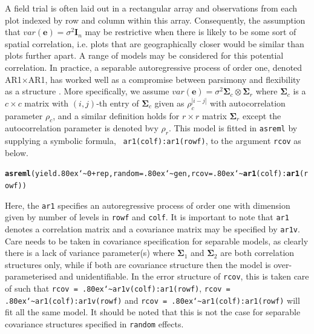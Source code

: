\documentclass[runningheads]{llncs}\usepackage[]{graphicx}\usepackage[]{color}
\makeatletter
\newcommand{\hlnum}[1]{\textcolor[rgb]{0.686,0.059,0.569}{#1}}%
\newcommand{\hlopt}[1]{\textcolor[rgb]{0,0,0}{#1}}%
\newcommand{\hlstd}[1]{\textcolor[rgb]{0.345,0.345,0.345}{#1}}%
\newcommand{\hlkwc}[1]{\textcolor[rgb]{0.333,0.667,0.333}{#1}}%
\newcommand{\hlkwd}[1]{\textcolor[rgb]{0.737,0.353,0.396}{\textbf{#1}}}%
\newenvironment{kframe}{%
 \def\at@end@of@kframe{}%
 \ifinner\ifhmode%
  \def\at@end@of@kframe{\end{minipage}}%
  \begin{minipage}{\columnwidth}%
 \fi\fi%
 \def\FrameCommand##1{\hskip\@totalleftmargin \hskip-\fboxsep
 \colorbox{shadecolor}{##1}\hskip-\fboxsep
     \hskip-\linewidth \hskip-\@totalleftmargin \hskip\columnwidth}%
 \MakeFramed {\advance\hsize-\width
   \@totalleftmargin\z@ \linewidth\hsize
   \@setminipage}}%
 {\par\unskip\endMakeFramed%
 \at@end@of@kframe}
\newenvironment{knitrout}{}{} %
\newcommand{\mytilde}{\lower.80ex\hbox{\char`\~}}
\makeatother
\begin{document}
A field trial is often laid out in a rectangular array and observations from each plot indexed by row and column within this array. Consequently, the assumption that $var(\boldsymbol{e}) = \sigma^2\mathbf{I}_n$ may be restrictive when there is likely to be some sort of spatial correlation, i.e. plots that are geographically closer would be similar than plots further apart. A range of models may be considered for this potential correlation. In practice, a separable autoregressive process of order one, denoted AR1$\times$AR1, has worked well as a compromise between parsimony and flexibility as a structure \citep{Gilmour1997}. More specifically, we assume $var(\boldsymbol{e}) = \sigma^2\mathbf{\Sigma}_c\otimes \mathbf{\Sigma}_r$ where $\mathbf{\Sigma}_c$ is a $c \times c$ matrix with $(i,j)$-th entry of $\mathbf{\Sigma}_c$ given as $\rho_c^{|i - j|}$ with autocorrelation parameter $\rho_c$, and a similar definition holds for $r\times r$ matrix $\mathbf{\Sigma}_r$ except the autocorrelation parameter is denoted bvy $\rho_r$. This model is fitted in \texttt{asreml} by supplying a symbolic formula, \texttt{~ar1(colf):ar1(rowf)}, to the argument \texttt{rcov} as below.

\begin{knitrout}
	\color{fgcolor}\begin{kframe}
		\begin{alltt}
			\hlkwd{asreml}\hlstd{(yield} \hlopt{\mytilde} \hlnum{0} \hlopt{+} \hlstd{rep,} \hlkwc{random} \hlstd{=} \hlopt{\mytilde}\hlstd{gen,} \hlkwc{rcov} \hlstd{=} \hlopt{\mytilde}\hlkwd{ar1}\hlstd{(colf)}\hlopt{:}\hlkwd{ar1}\hlstd{(rowf))}
		\end{alltt}
	\end{kframe}
\end{knitrout}

Here, the \texttt{ar1} specifies an autoregressive process of order one with dimension given by number of levels in \texttt{rowf} and \texttt{colf}. It is important to note that \texttt{ar1} denotes a correlation matrix and a covariance matrix may be specified by \texttt{ar1v}. Care needs to be taken in covariance specification for separable models, as clearly there is a lack of variance parameter(s) where $\mathbf{\Sigma}_1$ and $\mathbf{\Sigma}_2$ are both correlation structures only, while if both are covariance structure then the model is over-parameterised and unidentifiable. In the error structure of \texttt{rcov}, this is taken care of such that 
\texttt{rcov = \mytilde ar1v(colf):ar1(rowf)}, \texttt{rcov = \mytilde ar1(colf):ar1v(rowf)} and \texttt{rcov = \mytilde ar1(colf):ar1(rowf)} will fit all the same model. It should be noted that this is not the case for separable covariance structures specified in \texttt{random} effects.
\end{document}
